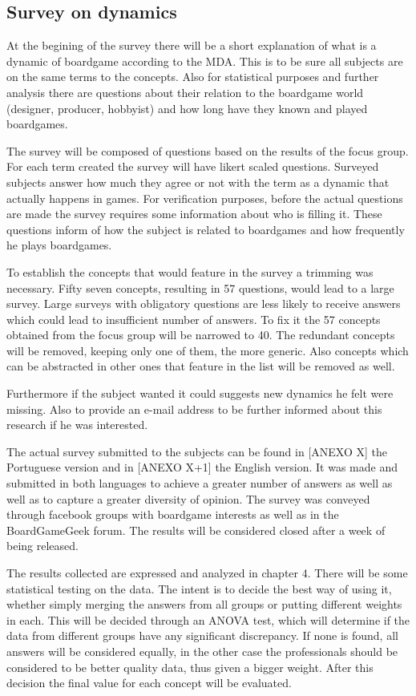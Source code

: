 \subsection{Survey on dynamics}

At the begining of the survey there will be a short explanation of what is a dynamic of boardgame according to the MDA. This is to be sure all subjects are on the same terms to the concepts. Also for statistical purposes and further analysis there are questions about their relation to the boardgame world (designer, producer, hobbyist) and how long have they known and played boardgames.

The survey will be composed of questions based on the results of the focus group. For each term created the survey will have likert scaled questions. Surveyed subjects answer how much they agree or not with the term as a dynamic that actually happens in games. For verification purposes, before the actual questions are made the survey requires some information about who is filling it. These questions inform of how the subject is related to boardgames and how frequently he plays boardgames. \citep{devellis2016scale}

To establish the concepts that would feature in the survey a trimming was necessary. Fifty seven concepts, resulting in 57 questions, would lead to a large survey. Large surveys with obligatory questions are less likely to receive answers which could lead to insufficient number of answers. To fix it the 57 concepts obtained from the focus group will be narrowed to 40. The redundant concepts will be removed, keeping only one of them, the more generic. Also concepts which can be abstracted in other ones that feature in the list will be removed as well. \citep{malhotra2012pesquisaMarketing}

Furthermore if the subject wanted it could suggests new dynamics he felt were missing. Also to provide an e-mail address to be further informed about this research if he was interested. 

The actual survey submitted to the subjects can be found in [ANEXO X] the Portuguese version and in [ANEXO X+1] the English version. It was made and submitted in both languages to achieve a greater number of answers as well as well as to capture a greater diversity of opinion. The survey was conveyed through facebook groups with boardgame interests as well as in the BoardGameGeek forum. The results will be considered closed after a week of being released.

The results collected are expressed and analyzed in chapter 4. There will be some statistical testing on the data. The intent is to decide the best way of using it, whether simply merging the answers from all groups or putting different weights in each. This will be decided through an ANOVA test, which will determine if the data from different groups have any significant discrepancy. If none is found, all answers will be considered equally, in the other case the professionals should be considered to be better quality data, thus given a bigger weight. After this decision the final value for each concept will be evaluated.

